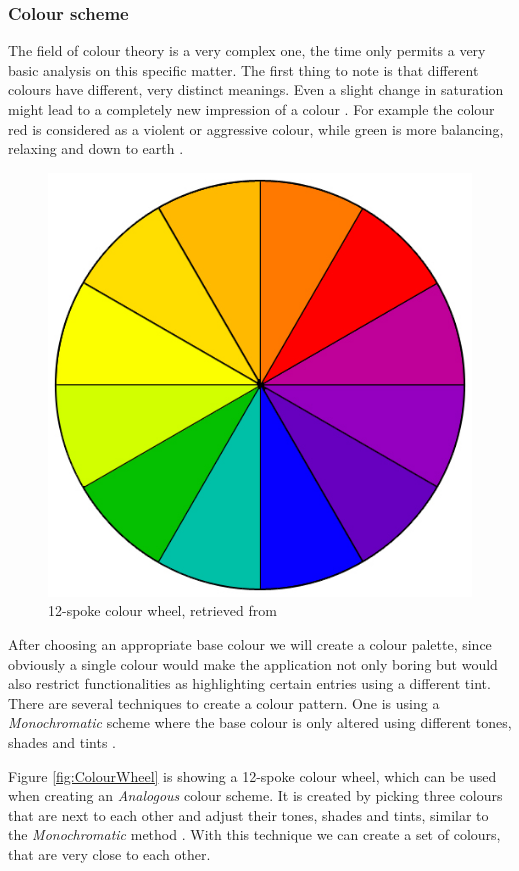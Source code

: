 \subsubsection{Colour scheme}
\label{sec:ColourConcept}

The field of colour theory is a very complex one, the time only permits a very basic analysis on this specific matter. The first thing to note is that different colours have different, very distinct meanings. Even a slight change in saturation might lead to a completely new impression of a colour \cite{Chapman:2010aa}. For example the colour red is considered as a violent or aggressive colour, while green is more balancing, relaxing and down to earth \cite{Chapman:2010aa}.

\begin{figure}[h]
  	\centering
  	\includegraphics[width=0.5\linewidth]{./images/colorwheel.jpg}
  	\caption{12-spoke colour wheel, retrieved from \cite{Chapman:2010ab}}
	\label{fig:ColourWheel}
\end{figure}

After choosing an appropriate base colour we will create a colour palette, since obviously a single colour would make the application not only boring but would also restrict functionalities as highlighting certain entries using a different tint. There are several techniques to create a colour pattern. One is using a \emph{Monochromatic} scheme where the base colour is only altered using different tones, shades and tints \cite{Chapman:2010ab}. 


Figure \vref{fig:ColourWheel} is showing a 12-spoke colour wheel, which can be used when creating an \emph{Analogous} colour scheme. It is created by picking three colours that are next to each other and adjust their tones, shades and tints, similar to the \emph{Monochromatic} method \cite{Chapman:2010ab}. With this technique we can create a set of colours, that are very close to each other.

